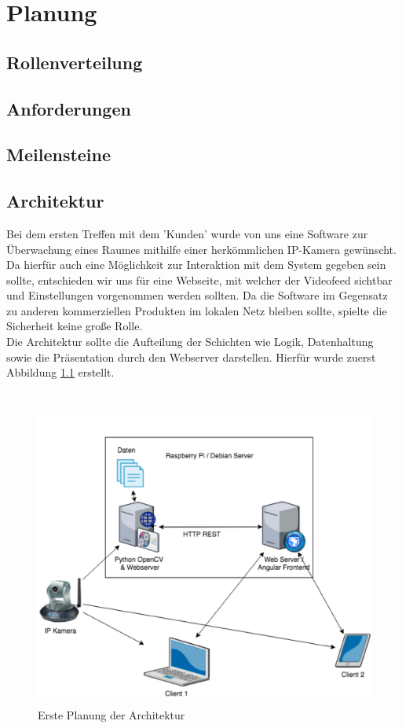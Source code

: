 \chapter{Planung}
\section{Rollenverteilung}
\section{Anforderungen}
\section{Meilensteine}
\section{Architektur}
Bei dem ersten Treffen mit dem 'Kunden' wurde von uns eine Software zur Überwachung eines Raumes mithilfe einer herkömmlichen IP-Kamera gewünscht.
Da hierfür auch eine Möglichkeit zur Interaktion mit dem System gegeben sein sollte, entschieden wir uns für eine Webseite, mit welcher
der Videofeed sichtbar und Einstellungen vorgenommen werden sollten. Da die Software im Gegensatz zu anderen kommerziellen Produkten im lokalen Netz bleiben sollte,
spielte die Sicherheit keine große Rolle.\\
Die Architektur sollte die Aufteilung der Schichten wie Logik, Datenhaltung sowie die Präsentation durch den Webserver darstellen.
Hierfür wurde zuerst Abbildung \ref{img:architecture-sketch} erstellt.\\\\
\begin{figure}[h]
	\centering
	\includegraphics[height=10cm]{content/pictures/architecture-sketch.png}
	\caption{Erste Planung der Architektur}
	\label{img:architecture-sketch}
\end{figure}
